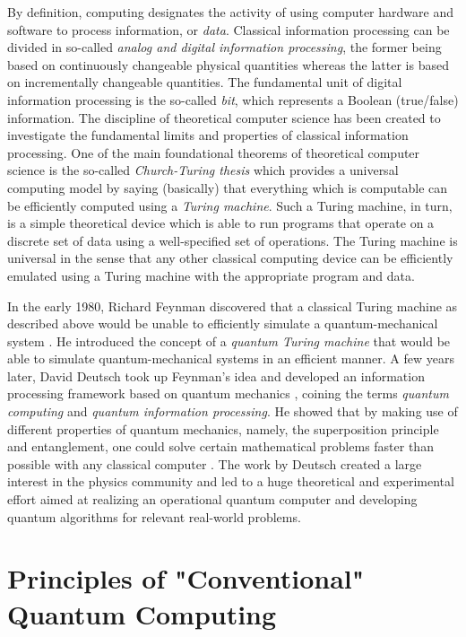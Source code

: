 By definition, computing designates the activity of using computer hardware and software to process information, or {\it data}. Classical information processing can be divided in so-called {\it analog and digital information processing}, the former being based on continuously changeable physical quantities whereas the latter is based on incrementally changeable quantities. The fundamental unit of digital information processing is the so-called {\it bit}, which represents a Boolean (true/false) information. The discipline of theoretical computer science has been created to investigate the fundamental limits and properties of classical information processing. One of the main foundational theorems of theoretical computer science is the so-called {\it Church-Turing thesis} which provides a universal computing model by saying (basically) that everything which is computable can be efficiently computed using a {\it Turing machine}. Such a Turing machine, in turn, is a simple theoretical device which is able to run programs that operate on a discrete set of data using a well-specified set of operations. The Turing machine is universal in the sense that any other classical computing device can be efficiently emulated using a Turing machine with the appropriate program and data.

\smallskip

In the early 1980, Richard Feynman discovered that a classical Turing machine as described above would be unable to efficiently simulate a quantum-mechanical system \citep{feynman_simulating_1982}. He introduced the concept of a {\it quantum Turing machine} that would be able to simulate quantum-mechanical systems in an efficient manner. A few years later, David Deutsch took up Feynman's idea and developed an information processing framework based on quantum mechanics \citep{deutsch_quantum_1985}, coining the terms {\it quantum computing} and {\it quantum information processing}. He showed that by making use of different properties of quantum mechanics, namely, the superposition principle and entanglement, one could solve certain mathematical problems faster than possible with any classical computer \citep{deutsch_quantum_1985}. The work by Deutsch created a large interest in the physics community and led to a huge theoretical and experimental effort aimed at realizing an operational quantum computer and developing quantum algorithms for relevant real-world problems.

\section{Principles of "Conventional" Quantum Computing}

